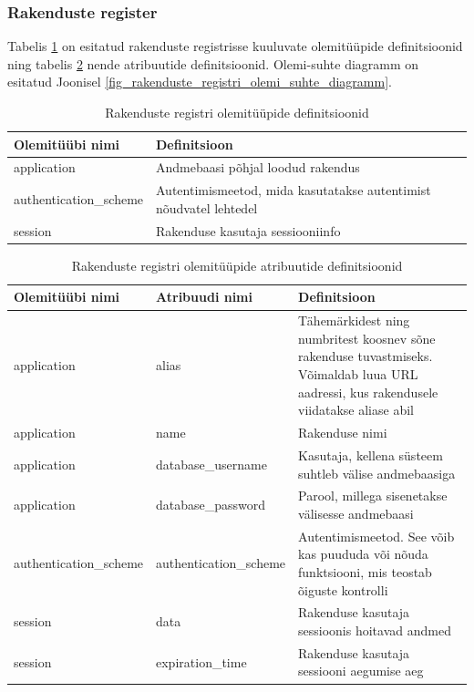 \documentclass[a4paper,12pt]{article} %
\begin{document}
\subsubsection{Rakenduste register}
Tabelis \ref{table_er_rakenduste_registri_olemitüüpide_definitsioonid} on esitatud rakenduste registrisse kuuluvate olemitüüpide definitsioonid ning tabelis \ref{table_er_rakenduste_registri_olemitüüpide_atribuutide_definitsioonid} nende atribuutide definitsioonid. Olemi-suhte diagramm on esitatud Joonisel \ref{fig_rakenduste_registri_olemi_suhte_diagramm}.

\begin{table}[H]
\centering
\caption{Rakenduste registri olemitüüpide definitsioonid}
\label{table_er_rakenduste_registri_olemitüüpide_definitsioonid}
\begin{tabular}{|p{4cm}|p{11cm}|}
\hline
\rowcolor{rowgray}
Olemitüübi nimi & Definitsioon \\ \hline
application & Andmebaasi põhjal loodud rakendus \\ \hline
authentication\_scheme & Autentimismeetod, mida kasutatakse autentimist nõudvatel lehtedel \\ \hline
session & Rakenduse kasutaja sessiooniinfo \\ \hline
\end{tabular}
\end{table}

\begin{table}[H]
\centering
\caption{Rakenduste registri olemitüüpide atribuutide definitsioonid}
\label{table_er_rakenduste_registri_olemitüüpide_atribuutide_definitsioonid}
\begin{tabular}{|p{4cm}|p{4cm}|p{7cm}|}
\hline
\rowcolor{rowgray}
Olemitüübi nimi & Atribuudi nimi & Definitsioon \\ \hline
application & alias & Tähemärkidest ning numbritest koosnev sõne rakenduse tuvastmiseks. Võimaldab luua URL aadressi, kus rakendusele viidatakse aliase abil \\ \hline
application  & name & Rakenduse nimi \\ \hline
application  & database\_username & Kasutaja, kellena süsteem suhtleb välise andmebaasiga \\ \hline
application  & database\_password & Parool, millega sisenetakse välisesse andmebaasi \\ \hline
authentication\_scheme & authentication\_scheme & Autentimismeetod. See võib kas puududa või nõuda funktsiooni, mis teostab õiguste kontrolli \\ \hline
session & data & Rakenduse kasutaja sessioonis hoitavad andmed \\ \hline
session & expiration\_time & Rakenduse kasutaja sessiooni aegumise aeg \\ \hline
\end{tabular}
\end{table}
\end{document}

